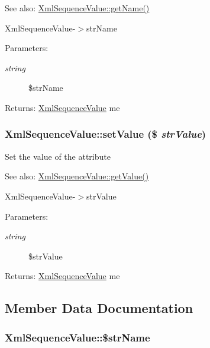 \begin{Desc}
\item[See also:]\hyperlink{class_xml_sequence_value_79b06938543618ff0d4f88eb93032348}{XmlSequenceValue::getName()} 

XmlSequenceValue-$>$strName \end{Desc}
\begin{Desc}
\item[Parameters:]
\begin{description}
\item[{\em string}]\$strName \end{description}
\end{Desc}
\begin{Desc}
\item[Returns:]\hyperlink{class_xml_sequence_value}{XmlSequenceValue} me \end{Desc}
\hypertarget{class_xml_sequence_value_2538a3f131eec1c88ee21d963ebfb011}{
\subsubsection[{setValue}]{\setlength{\rightskip}{0pt plus 5cm}XmlSequenceValue::setValue (\$ {\em strValue})}}
\label{class_xml_sequence_value_2538a3f131eec1c88ee21d963ebfb011}


Set the value of the attribute

\begin{Desc}
\item[See also:]\hyperlink{class_xml_sequence_value_6a7ae3d278b686a9978e02298d8a432b}{XmlSequenceValue::getValue()} 

XmlSequenceValue-$>$strValue \end{Desc}
\begin{Desc}
\item[Parameters:]
\begin{description}
\item[{\em string}]\$strValue \end{description}
\end{Desc}
\begin{Desc}
\item[Returns:]\hyperlink{class_xml_sequence_value}{XmlSequenceValue} me \end{Desc}


\subsection{Member Data Documentation}
\hypertarget{class_xml_sequence_value_6b07f7e06d0c1d63505f55f449a5b16a}{
\subsubsection[{\$strName}]{\setlength{\rightskip}{0pt plus 5cm}XmlSequenceValue::\$strName}}
\label{class_xml_sequence_value_6b07f7e06d0c1d63505f55f449a5b16a}


